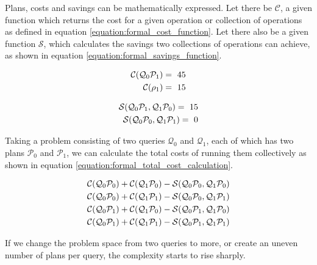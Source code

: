 Plans, costs and savings can be mathematically expressed. Let there be $\mathcal{C}$, a given function which returns the cost for a given operation or collection of operations as defined in equation \ref{equation:formal_cost_function}. Let there also be a given function $\mathcal{S}$, which calculates the savings two collections of operations can achieve, as shown in equation \ref{equation:formal_savings_function}.

\begin{equation}
    \centering
    \begin{split}
        \mathcal{C}(\mathcal{Q}_0\mathcal{P}_1) =\ 45 \\
        \mathcal{C}(\rho_1) =\ 15 \\
    \end{split}
    \label{equation:formal_cost_function}
\end{equation}

\begin{equation}
    \centering
    \begin{split}
        \mathcal{S}(\mathcal{Q}_0\mathcal{P}_1, \mathcal{Q}_1\mathcal{P}_0) =\ 15 \\
        \mathcal{S}(\mathcal{Q}_0\mathcal{P}_0, \mathcal{Q}_1\mathcal{P}_1) =\ 0 \\
    \end{split}
    \label{equation:formal_savings_function}
\end{equation}


Taking a problem consisting of two queries $\mathcal{Q}_0$ and $\mathcal{Q}_1$, each of which has two plans $\mathcal{P}_0$ and $\mathcal{P}_1$, we can calculate the total costs of running them collectively as shown in equation \ref{equation:formal_total_cost_calculation}.

\begin{equation}
    \centering
    \begin{split}
        \mathcal{C}(\mathcal{Q}_0\mathcal{P}_0) + \mathcal{C}(\mathcal{Q}_1\mathcal{P}_0) - \mathcal{S}(\mathcal{Q}_0\mathcal{P}_0, \mathcal{Q}_1\mathcal{P}_0) \\
        \mathcal{C}(\mathcal{Q}_0\mathcal{P}_0) + \mathcal{C}(\mathcal{Q}_1\mathcal{P}_1) - \mathcal{S}(\mathcal{Q}_0\mathcal{P}_0, \mathcal{Q}_1\mathcal{P}_1) \\
        \mathcal{C}(\mathcal{Q}_0\mathcal{P}_1) + \mathcal{C}(\mathcal{Q}_1\mathcal{P}_0) - \mathcal{S}(\mathcal{Q}_0\mathcal{P}_1, \mathcal{Q}_1\mathcal{P}_0) \\
        \mathcal{C}(\mathcal{Q}_0\mathcal{P}_1) + \mathcal{C}(\mathcal{Q}_1\mathcal{P}_1) - \mathcal{S}(\mathcal{Q}_0\mathcal{P}_1, \mathcal{Q}_1\mathcal{P}_1) \\
    \end{split}
    \label{equation:formal_total_cost_calculation}
\end{equation}

If we change the problem space from two queries to more, or create an uneven number of plans per query, the complexity starts to rise sharply.



\newpage
